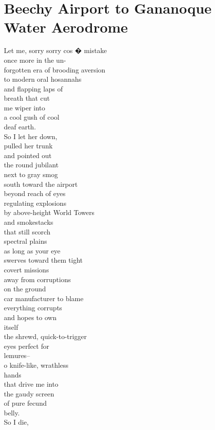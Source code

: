 \documentclass[smalldemyvopaper,11pt,twoside,onecolumn,openright,extrafontsizes]{memoir}
\begin{document}
\chapter{Beechy Airport to Gananoque Water Aerodrome}
Let me, sorry sorry cos �           mistake
\\once more in the un-
\\forgotten era of brooding aversion
\\to modern oral hosannahs
\\and flapping laps of
\\breath that cut
\\me wiper into
\\a cool gush of cool
\\deaf earth.
\\So          I let her down,
\\pulled her trunk
\\and pointed out
\\the round jubilant
\\next to gray smog
\\south toward the airport
\\beyond reach of eyes
\\regulating explosions
\\by above-height World Towers
\\and smokestacks
\\that still scorch
\\spectral plains
\\as long as your eye
\\swerves toward them tight
\\covert missions
\\away from corruptions
\\on the ground
\\car manufacturer to blame
\\everything corrupts
\\and hopes to own
\\itself
\\the shrewd, quick-to-trigger
\\eyes perfect for
\\lemures--
\\o knife-like, wrathless
\\hands
\\that drive me into
\\the gaudy screen
\\of pure fecund
\\belly.
\\So I die,
\end{document}

